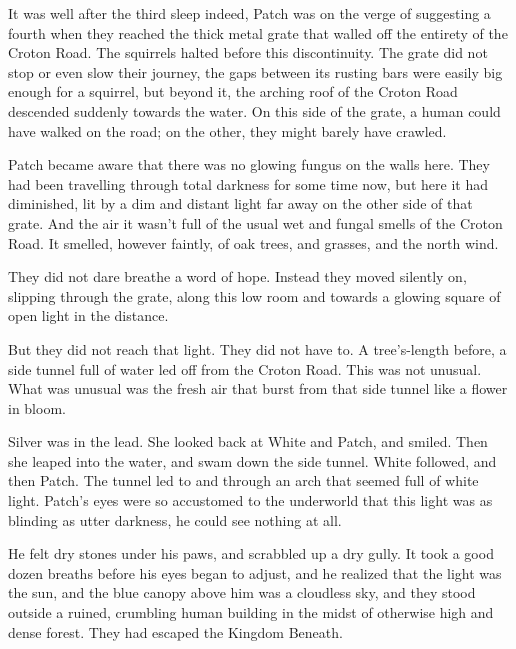 \documentclass[11pt]{article}
\begin{document}
 It was well after the third sleep %
 indeed, Patch was on the verge of suggesting a fourth %
 when they reached the thick metal grate that walled off the entirety of the Croton Road. The squirrels halted before this discontinuity. The grate did not stop or even slow their journey, the gaps between its rusting bars were easily big enough for a squirrel, but beyond it, the arching roof of the Croton Road descended suddenly towards the water. On this side of the grate, a human could have walked on the road; on the other, they might barely have crawled.\par
 Patch became aware that there was no glowing fungus on the walls here. They had been travelling through total darkness for some time now, but here it had diminished, lit by a dim and distant light far away on the other side of that grate. And the air %
 it wasn't full of the usual wet and fungal smells of the Croton Road. It smelled, however faintly, of oak trees, and grasses, and the north wind.\par
 They did not dare breathe a word of hope. Instead they moved silently on, slipping through the grate, along this low room %
 and towards a glowing square of open light in the distance.\par
But they did not reach that light. They did not have to. A tree's-length before, a side tunnel full of water led off from the Croton Road. This was not unusual. What was unusual was the fresh air that burst from that side tunnel like a flower in bloom.\par
 Silver was in the lead. She looked back at White and Patch, and smiled. Then she leaped into the water, and swam down the side tunnel. White followed, and then Patch. The tunnel led to and through an arch that seemed full of white light. Patch's eyes were so accustomed to the underworld that this light was as blinding as utter darkness, he could see nothing at all.\par
He felt dry stones under his paws, and scrabbled up a dry gully. It took a good dozen breaths before his eyes began to adjust, and he realized that the light was the sun, and the blue canopy above him was a cloudless sky, and they stood outside a ruined, crumbling human building in the midst of otherwise high and dense forest. They had escaped the Kingdom Beneath.\par
{}\par
\end{document}
